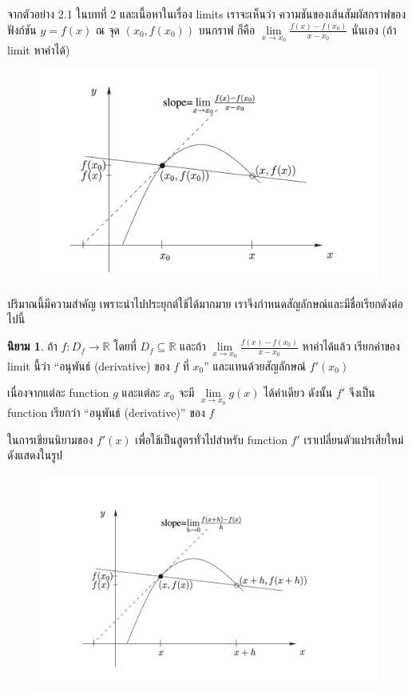\documentclass[
]{book}
\theoremstyle{definition}
\newtheorem{definition}{นิยาม}[chapter]
\theoremstyle{definition}
\theoremstyle{definition}
\theoremstyle{definition}
\theoremstyle{remark}
\begin{document}
จากตัวอย่าง 2.1 ในบทที่ 2 และเนื้อหาในเรื่อง limits เราจะเห็นว่า
ความชันของเส้นสัมผัสกราฟของฟังก์ชัน \(y=f\left( x\right)\) ณ จุด
\(\left( x_{0},f\left( x_{0}\right) \right)\) บนกราฟ ก็คือ
\(\underset{x\rightarrow x_{0}}{\lim}\frac{f\left( x\right) -f\left( x_{0}\right) }{x-x_{0}}\)
นั่นเอง (ถ้า limit หาค่าได้)

\begin{figure}

{\centering \includegraphics[width=0.5\linewidth]{images/fig-derivative-1} 

}

\end{figure}

ปริมาณนี้มีความสำคัญ เพราะนำไปประยุกต์ใช้ได้มากมาย
เราจึงกำหนดสัญลักษณ์และมีชื่อเรียกดังต่อไปนี้

\begin{definition}
ถ้า \(f : D_f \rightarrow \mathbb{R}\) โดยที่ \(D_f \subseteq \mathbb{R}\)
และถ้า \(\underset{x \rightarrow x_0}{\lim} \frac{f(x)-f(x_0)}{x- x_0}\)
หาค่าได้แล้ว เรียกค่าของ limit นี้ว่า ``อนุพันธ์ (derivative) ของ \(f\) ที่ \(x_0\)''
และแทนด้วยสัญลักษณ์ \(f'(x_0)\)
\end{definition}

เนื่องจากแต่ละ function \(g\) และแต่ละ \(x_0\) จะมี
\(\underset{x \rightarrow x_0}{\lim}g(x)\) ได้ค่าเดียว ดังนั้น \(f'\) จึงเป็น
function เรียกว่า ``อนุพันธ์ (derivative)'' ของ \(f\)

ในการเขียนนิยามของ \(f'(x)\) เพื่อใช้เป็นสูตรทั่วไปสำหรับ function \(f'\)
เราเปลี่ยนตัวแปรเสียใหม่ ดังแสดงในรูป

\begin{figure}

{\centering \includegraphics[width=0.5\linewidth]{images/fig-derivative-2} 

}

\end{figure}
\end{document}
